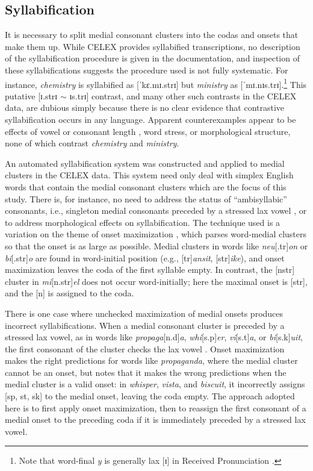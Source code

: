 \subsection{Syllabification}

It is necessary to split medial consonant clusters into the codas and onsets that make them up. While CELEX provides syllabified transcriptions, no description of the syllabification procedure is given in the documentation, and inspection of these syllabifications suggests the procedure used is not fully systematic. For instance, \emph{chemistry} is syllabified as [ˈkɛ.mɪ.strɪ] but \emph{ministry} as [ˈmɪ.nɪs.trɪ].\footnote{Note that word-final \emph{y} is generally lax [ɪ] in Received Pronunciation \citep[][294]{AOE2}.} This putative [ɪ.strɪ $\sim$ ɪs.trɪ] contrast, and many other such contrasts in the CELEX data, are dubious simply because there is no clear evidence that contrastive syllabification occurs in any language. Apparent counterexamples appear to be effects of vowel or consonant length \citep[e.g.,][]{Elfner2006}, word stress, or morphological structure, none of which contrast \emph{chemistry} and \emph{ministry}.  

An automated syllabification system was constructed and applied to medial clusters in the CELEX data. This system need only deal with simplex English words that contain the medial consonant clusters which are the focus of this study.  There is, for instance, no need to address the status of ``ambisyllabic'' consonants, i.e., singleton medial consonants preceded by a stressed lax vowel \citep[][219f.]{Rubach1996}, or to address morphological effects on syllabification. The technique used is a variation on the theme of onset maximization \citep[42f.]{Kahn1976}, which parses word-medial clusters so that the onset is as large as possible. Medial clusters in words like \emph{neu}[.tr]\emph{on} or \emph{bi}[.str]\emph{o} are found in word-initial position (e.g., [tr]\emph{ansit}, [str]\emph{ike}), and onset maximization leaves the coda of the first syllable empty. In contrast, the [nstr] cluster in \emph{mi}[n.str]\emph{el} does not occur word-initially; here the maximal onset is [str], and the [n] is assigned to the coda.

There is one case where unchecked maximization of medial onsets produces incorrect syllabifications. When a medial consonant cluster is preceded by a stressed lax vowel, as in words like \emph{propaga}[n.d]\emph{a}, \emph{whi}[s.p]\emph{er}, \emph{vi}[s.t]\emph{a}, or \emph{bi}[s.k]\emph{uit}, the first consonant of the cluster checks the lax vowel \citep[e.g.,][3]{Hammond1997}. Onset maximization makes the right predictions for words like \emph{propaganda}, where the medial cluster cannot be an onset, but \citet[][55]{Harris1994} notes that it makes the wrong predictions when the medial cluster is a valid onset: in \emph{whisper}, \emph{vista}, and \emph{biscuit}, it incorrectly assigns [sp, st, sk] to the medial onset, leaving the coda empty. The approach adopted here is to first apply onset maximization, then to reassign the first consonant of a medial onset to the preceding coda if it is immediately preceded by a stressed lax vowel. 

